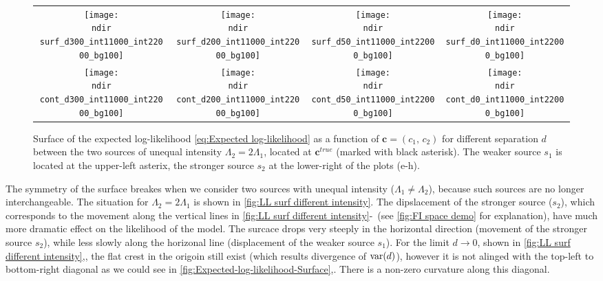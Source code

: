 \begin{figure}[!thb]
	\centering
	\newcommand{\sizeff}{.18}
	\newcommand{\sizegg}{.16}
	\newcommand{\ndir}{\qd gFREM/images/LLsurface/}
	\begin{tabular}{cccc}
		\subfloat[$d=300$ nm]{\texttt{[image: \\ndir surf\_d300\_int11000\_int22000\_bg100]}} 		
		& \subfloat[$d=200$ nm]{\texttt{[image: \\ndir surf\_d200\_int11000\_int22000\_bg100]}} 		
		& \subfloat[$d=50$ nm]{\texttt{[image: \\ndir surf\_d50\_int11000\_int22000\_bg100]}} 		
		& \subfloat[$d=0$ nm]{\texttt{[image: \\ndir surf\_d0\_int11000\_int22000\_bg100]}} 		
		\tabularnewline
		\subfloat[$d=300$ nm]{\texttt{[image: \\ndir cont\_d300\_int11000\_int22000\_bg100]}} 
		& \subfloat[$d=200$ nm]{\texttt{[image: \\ndir cont\_d200\_int11000\_int22000\_bg100]}} 		
		& \subfloat[$d=50$ nm]{\texttt{[image: \\ndir cont\_d50\_int11000\_int22000\_bg100]}} 		
		& \subfloat[$d=0$ nm]{\texttt{[image: \\ndir cont\_d0\_int11000\_int22000\_bg100]}} 		
		\tabularnewline
	\end{tabular}
	\caption{Surface of the expected log-likelihood \autoref{eq:Expected log-likelihood} as a function of $\bm{c}=(c_1,\, c_2)$ for different separation $d$ between the two sources of unequal intensity $\Lambda_2=2\Lambda_1$, located at $\bm{c}^{true}$ (marked with black asterisk). The weaker source $s_1$ is located at the upper-left asterix, the stronger source $s_2$ at the lower-right of the plots (e-h).}	
	\label{fig:LL surf different intensity}
\end{figure}
%
The symmetry of the surface breakes when we consider two sources with unequal intensity ($\Lambda_1\neq\Lambda_2$), because such sources are no longer interchangeable. The situation for $\Lambda_2=2\Lambda_1$ is shown in \autoref{fig:LL surf different intensity}. The dipslacement of the stronger source ($s_2$), which corresponds to the movement along the vertical lines in \autoref{fig:LL surf different intensity}\eee-\hhh\ (see \autoref{fig:FI space demo} for explanation), have much more dramatic effect on the likelihood of the model. The surcace drops very steeply in the horizontal direction (movement of the stronger source $s_2$), while less slowly along the horizonal line (displacement of the weaker source $s_1$). For the limit $d\rightarrow 0$, shown in \autoref{fig:LL surf different intensity}\ddd,\hhh, the flat crest in the origoin still exist (which results divergence of $\mathrm{var}(d)$), however it is not alinged with the top-left to bottom-right diagonal as we could see in \autoref{fig:Expected-log-likelihood-Surface}\ddd,\hhh. There is a non-zero curvature along this diagonal.

